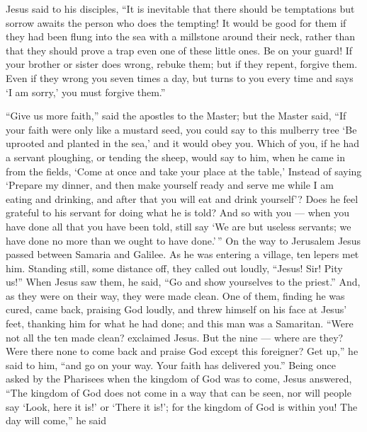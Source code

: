  Jesus said to his disciples, ``It is inevitable that there
should be temptations but sorrow awaits the person who does the
tempting!  It would be good for them if they had been flung
into the sea with a millstone around their neck, rather than that they
should prove a trap even one of these little ones.  Be on
your guard! If your brother or sister does wrong, rebuke them; but if
they repent, forgive them.  Even if they wrong you seven
times a day, but turns to you every time and says `I am sorry,' you must
forgive them.''

 ``Give us more faith,'' said the apostles to the Master;
 but the Master said, ``If your faith were only like a
mustard seed, you could say to this mulberry tree `Be uprooted and
planted in the sea,' and it would obey you.  Which of you,
if he had a servant ploughing, or tending the sheep, would say to him,
when he came in from the fields, `Come at once and take your place at
the table,'  Instead of saying `Prepare my dinner, and then
make yourself ready and serve me while I am eating and drinking, and
after that you will eat and drink yourself'?  Does he feel
grateful to his servant for doing what he is told?  And so
with you --- when you have done all that you have been told, still say
`We are but useless servants; we have done no more than we ought to have
done.'\,''  On the way to Jerusalem Jesus passed between
Samaria and Galilee.  As he was entering a village, ten
lepers met him.  Standing still, some distance off, they
called out loudly, ``Jesus! Sir! Pity us!''  When Jesus saw
them, he said, ``Go and show yourselves to the priest.'' And, as they
were on their way, they were made clean.  One of them,
finding he was cured, came back, praising God loudly,  and
threw himself on his face at Jesus' feet, thanking him for what he had
done; and this man was a Samaritan.  ``Were not all the ten
made clean? exclaimed Jesus. But the nine --- where are they?
 Were there none to come back and praise God except this
foreigner?  Get up,'' he said to him, ``and go on your way.
Your faith has delivered you.''  Being once asked by the
Pharisees when the kingdom of God was to come, Jesus answered, ``The
kingdom of God does not come in a way that can be seen, 
nor will people say `Look, here it is!' or `There it is!'; for the
kingdom of God is within you!  The day will come,'' he said
